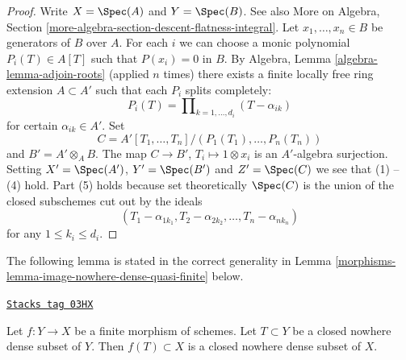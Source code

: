 \begin{proof}
Write $X = \Spec(A)$ and $Y = \Spec(B)$. See also
More on Algebra, Section \ref{more-algebra-section-descent-flatness-integral}.
Let $x_1, \ldots, x_n \in B$ be generators of $B$ over $A$.
For each $i$ we can choose a monic polynomial $P_i(T) \in A[T]$
such that $P(x_i) = 0$ in $B$. By
Algebra, Lemma \ref{algebra-lemma-adjoin-roots}
(applied $n$ times) there exists a finite locally free ring
extension $A \subset A'$ such that each $P_i$ splits completely:
$$
P_i(T) = \prod\nolimits_{k = 1, \ldots, d_i} (T - \alpha_{ik})
$$
for certain $\alpha_{ik} \in A'$. Set
$$
C = A'[T_1, \ldots, T_n]/(P_1(T_1), \ldots, P_n(T_n))
$$
and $B' = A' \otimes_A B$. The map $C \to B'$, $T_i \mapsto 1 \otimes x_i$
is an $A'$-algebra surjection. Setting $X' = \Spec(A')$,
$Y' = \Spec(B')$ and $Z' = \Spec(C)$ we see that
(1) -- (4) hold. Part (5) holds because set theoretically
$\Spec(C)$ is the union of the closed subschemes
cut out by the ideals
$$
(T_1 - \alpha_{1k_1}, T_2 - \alpha_{2k_2}, \ldots, T_n - \alpha_{nk_n})
$$
for any $1 \leq k_i \leq d_i$.
\end{proof}

The following lemma is stated in the correct generality
in Lemma \ref{morphisms-lemma-image-nowhere-dense-quasi-finite} below.

\begin{lemma}
\label{morphisms-lemma-image-nowhere-dense-finite}
\href{https://stacks.math.columbia.edu/tag/03HX}{\texttt{Stacks tag 03HX}}

Let $f : Y \to X$ be a finite morphism of schemes.
Let $T \subset Y$ be a closed nowhere dense subset of $Y$.
Then $f(T) \subset X$ is a closed nowhere dense subset of $X$.
\end{lemma}

